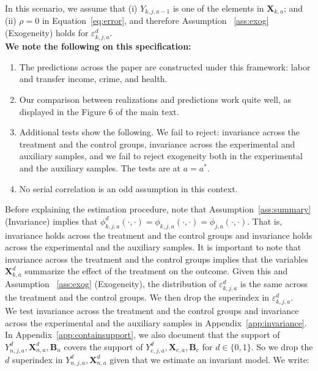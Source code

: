\noindent In this scenario, we assume that (i)  $Y_{k,j,a-1}$ is one of the elements in $\bm{X}_{k,a}$; and (ii) $\rho = 0$ in Equation~\eqref{eq:error}, and therefore Assumption ~\ref{ass:exog} (Exogeneity) holds for $\varepsilon_{k,j,a}^d$.\\

\noindent \textbf{We note the following on this specification:}

\begin{enumerate}
 
\item The predictions across the paper are constructed under this framework: labor and transfer income, crime, and health. 
\item Our comparison between realizations and predictions work quite well, as displayed in the Figure 6 of the main text. 
\item Additional tests show the following. We fail to reject: invariance across the treatment and the control groups, invariance across the experimental and auxiliary samples, and we fail to reject exogeneity both in the experimental and the auxiliary samples.  The tests are at $a = a^*$.
\item No serial correlation is an odd assumption in this context.
\end{enumerate}

\noindent Before explaining the estimation procedure, note that Assumption~\ref{ass:summary} (Invariance) implies that $\phi_{k,j,a}^d \left (\cdot, \cdot \right) = \phi_{k,j,a}  \left (\cdot, \cdot \right) = \phi_{j,a}  \left (\cdot, \cdot \right)$. That is, invariance holds across the treatment and the control groups and invariance holds across the experimental and the auxiliary samples. It is important to note that invariance across the treatment and the control groups implies that the variables $\bm{X}_{k,a}^d$ summarize the effect of the treatment on the outcome. Given this and Assumption ~\ref{ass:exog} (Exogeneity), the distribution of $\varepsilon_{k,j,a}^d$ is the same across the treatment and the control groups. We then drop the superindex in $\varepsilon_{k,j,a}^d$.\\ 

\noindent We test invariance across the treatment and the control groups and invariance across the experimental and the auxiliary samples  in Appendix~\ref{app:invariance}.\\

\noindent In Appendix~\ref{app:containsupport}, we also document that the support of $Y_{n,j,a}^d, \bm{X}_{n,a}^d, \bm{B}_{n}$ covers the support of $Y_{e,j,a}^d, \bm{X}_{e,a}, \bm{B}_{e}$ for $d \in \{0, 1\}$. So we drop the $d$ superindex in $Y_{n,j,a}^d, \bm{X}_{n,a}^d$ given that we estimate an invariant model. We write:


